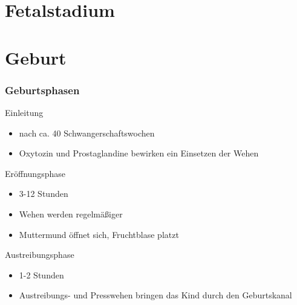 \documentclass{beamer}
\begin{document}
    






\section{Fetalstadium}

\section{Geburt}

\begin{frame}
\frametitle{Geburtsphasen }

\begin{block}{Einleitung}
\begin{itemize}
\item
nach ca.  40 Schwangerschaftswochen
\item
Oxytozin und Prostaglandine bewirken ein Einsetzen der Wehen
\end{itemize}
\end{block}

\pause

\begin{block}{Eröffnungsphase}
\begin{itemize}
\item
3-12 Stunden
\item
Wehen werden regelmäßiger
\item
Muttermund öffnet sich, Fruchtblase platzt
\end{itemize}
\end{block}

\pause

\begin{block}{Austreibungsphase}
\begin{itemize}
\item
1-2 Stunden
\item
Austreibungs- und Presswehen bringen das Kind durch den Geburtskanal
\end{itemize}
\end{block}


\end{frame}
\end{document}
